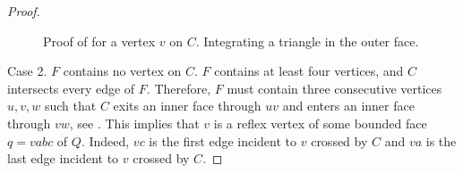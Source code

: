 \begin{proof}
  \begin{figure}
     \caption{Proof of  for a vertex
       $v$ on $C$. Integrating a triangle in the outer face.}
  \end{figure}
   
Case 2. $F$ contains no vertex on $C$.
$F$ contains at least four vertices, and $C$ intersects
   every edge of $F$.  Therefore,  
   $F$
    must contain three consecutive vertices
   $u,v,w$ such that $C$ exits an inner face through $uv$ and enters
   an inner face through $vw$, see .
  This implies that $v$ is a reflex vertex
   of some bounded face $q=vabc$ of $Q$.  Indeed, $vc$ is the first edge
   incident to $v$ crossed by $C$ and $va$ is the last edge incident to
   $v$ crossed by $C$.


\end{proof}
